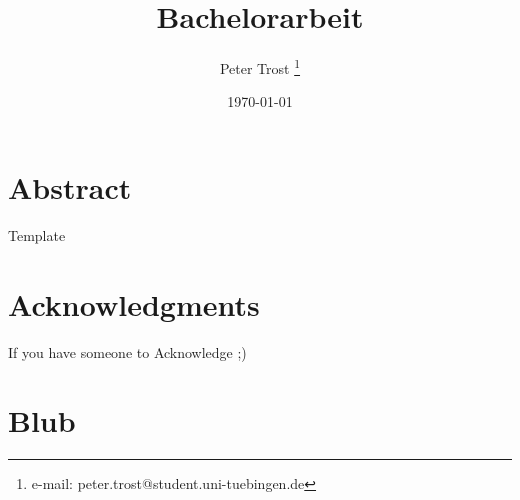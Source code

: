 \documentclass[a4paper,cleardoubleempty,BCOR1cm]{scrbook}
\title{Bachelorarbeit}
\author{Peter Trost \thanks{e-mail: peter.trost@student.uni-tuebingen.de}}
\date{\today}
\begin{document}


\chapter*{Abstract}
Template

\chapter*{Acknowledgments}
If you have someone to Acknowledge ;)

\tableofcontents












\appendix
\chapter{Blub}



\end{document}
